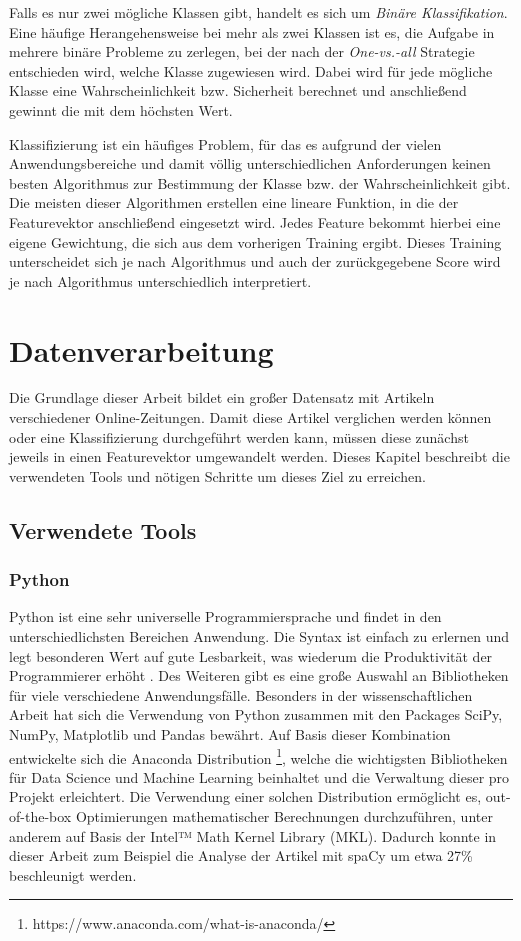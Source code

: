 Falls es nur zwei mögliche Klassen gibt, handelt es sich um \emph{Binäre Klassifikation}. Eine häufige Herangehensweise bei mehr als zwei Klassen ist es, die Aufgabe in mehrere binäre Probleme zu zerlegen, bei der nach der \emph{One-vs.-all} Strategie entschieden wird, welche Klasse zugewiesen wird. Dabei wird für jede mögliche Klasse eine Wahrscheinlichkeit bzw. Sicherheit berechnet und anschließend gewinnt die mit dem höchsten Wert.

Klassifizierung ist ein häufiges Problem, für das es aufgrund der vielen Anwendungsbereiche und damit völlig unterschiedlichen Anforderungen keinen besten Algorithmus zur Bestimmung der Klasse bzw. der Wahrscheinlichkeit gibt. Die meisten dieser Algorithmen erstellen eine lineare Funktion, in die der Featurevektor anschließend eingesetzt wird. Jedes Feature bekommt hierbei eine eigene Gewichtung, die sich aus dem vorherigen Training ergibt. Dieses Training unterscheidet sich je nach Algorithmus und auch der zurückgegebene Score wird je nach Algorithmus unterschiedlich interpretiert.


\chapter{Datenverarbeitung}
Die Grundlage dieser Arbeit bildet ein großer Datensatz mit Artikeln verschiedener Online-Zeitungen. Damit diese Artikel verglichen werden können oder eine Klassifizierung durchgeführt werden kann, müssen diese zunächst jeweils in einen Featurevektor umgewandelt werden. Dieses Kapitel beschreibt die verwendeten Tools und nötigen Schritte um dieses Ziel zu erreichen.

\section{Verwendete Tools}

\subsection{Python}\label{python}
Python ist eine sehr universelle Programmiersprache und findet in den unterschiedlichsten Bereichen Anwendung. Die Syntax ist einfach zu erlernen und legt besonderen Wert auf gute Lesbarkeit, was wiederum die Produktivität der Programmierer erhöht \cite{pythonSummary}. Des Weiteren gibt es eine große Auswahl an Bibliotheken für viele verschiedene Anwendungsfälle. Besonders in der wissenschaftlichen Arbeit hat sich die Verwendung von Python zusammen mit den Packages SciPy, NumPy, Matplotlib und Pandas bewährt. Auf Basis dieser Kombination entwickelte sich die Anaconda Distribution \footnote{https://www.anaconda.com/what-is-anaconda/}, welche die wichtigsten Bibliotheken für Data Science und Machine Learning beinhaltet und die Verwaltung dieser pro Projekt erleichtert. Die Verwendung einer solchen Distribution ermöglicht es, out-of-the-box Optimierungen mathematischer Berechnungen durchzuführen, unter anderem auf Basis der Intel™ Math Kernel Library (MKL). Dadurch konnte in dieser Arbeit zum Beispiel die Analyse der Artikel mit spaCy um etwa 27\% beschleunigt werden.

